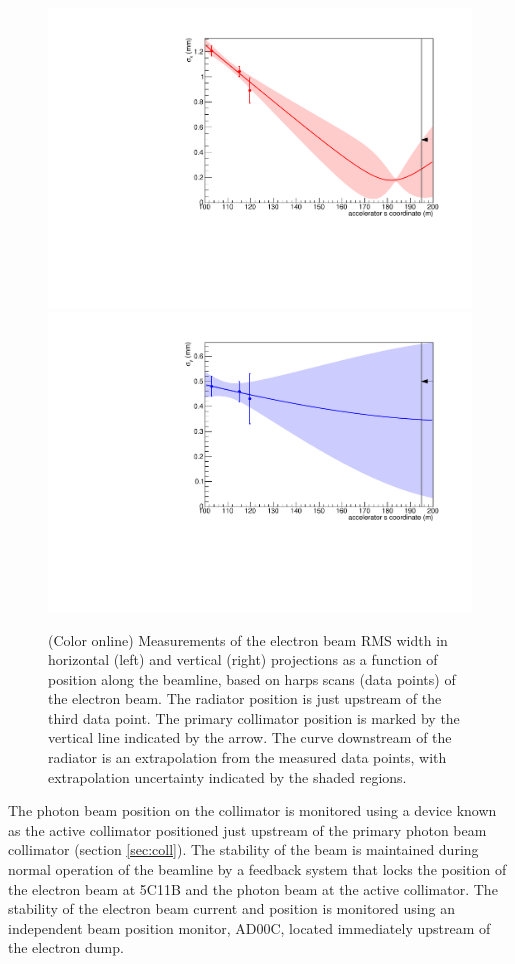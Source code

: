 \begin{figure}[tbp]
\begin{center}
 \includegraphics[clip=true,width=0.49\linewidth]{figures/harp-x-767755.pdf}
 \includegraphics[clip=true,width=0.49\linewidth]{figures/harp-y-767755.pdf}
\end{center}
\caption{(Color online) Measurements of the electron beam RMS width in horizontal (left)
and vertical (right) projections as a function of position along the beamline, based on
harps scans (data points) of the electron beam. The radiator position is just upstream
of the third data point. The primary collimator position is marked by the vertical line
indicated by the arrow. The curve downstream of the radiator is an extrapolation from
the measured data points, with extrapolation uncertainty indicated by the shaded regions.
        }
\label{fig:beam:convergence} 
\end{figure}

The photon beam position on the collimator is monitored using a device known as
the active collimator positioned just upstream of the primary photon beam collimator
(section \ref{sec:coll}). The stability of the beam is maintained during normal
operation of the beamline by a feedback system that locks the position of the electron
beam at 5C11B and the photon beam at the active collimator. The stability of the electron
beam current and position is monitored using an independent beam position monitor,
AD00C, located immediately upstream of the electron dump.



